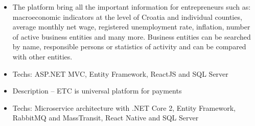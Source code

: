\documentclass[10pt,a4paper]{altacv}
\begin{document}
\medskip





\begin{itemize}
  \item \small{The platform bring all the important information for entrepreneurs such as: macroeconomic indicators at the level of Croatia and individual counties, average monthly net wage, registered unemployment rate, inflation, number of active business entities and many more. Business entities can be searched by name, responsible persons or statistics of activity and can be compared with other entities.}
  \item Techs: ASP.NET MVC, Entity Framework, ReactJS and SQL Server
\end{itemize}

\divider

%



\begin{itemize}
  \item Description -- ETC is universal platform for payments
  \item Techs: Microservice architecture with .NET Core 2, Entity Framework, RabbitMQ and MassTransit, React Native and SQL Server 
\end{itemize}




\divider


\divider





\end{document}
